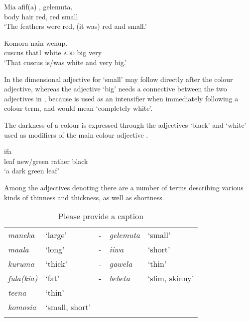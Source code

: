 \ea%
\label{ex:3:x1754}
\gll Mia afif(a) ,  gelemuta. \\
body hair red, red small\\
\glt`The feathers were red, (it was) red and small.'
\z

\ea%
\label{ex:3:x1755}
\gll Komora nain    wenup. \\
cuscus that1 white \textsc{add} big very\\
\glt`That cuscus is/was white and very big.'
\z

In  the dimensional adjective for `small' may follow directly after the colour adjective, whereas the adjective  `big' needs a connective between the two adjectives in , because  is used as an intensifier when immediately following a colour term, and  would mean `completely white'.

The darkness of a colour is expressed through the adjectives  `black' and  `white' used as modifiers of the main colour adjective .

\ea%
\label{ex:3:x110}
\gll ifa    \\
leaf new/green rather black\\
\glt`a dark green leaf'
\z

Among the adjectives denoting  there are a number of terms describing various kinds of thinness and thickness, as well as shortness. 

\begin{table}
\caption{Please provide a caption}
 
\begin{tabular}{>{\itshape}llc>{\itshape}ll}
\mytoprule
maneka &`large' &- &gelemuta &`small'\\
maala &`long' &- &iiwa &`short'\\
kuruma &`thick' &- &gawela &`thin'\\
fula(kia) &`fat' &- &bebeta &`slim, skinny'\\
teena &`thin'&&&\\
komosia &`small, short'&&&\\
\mybottomrule
\end{tabular}
\end{table}

